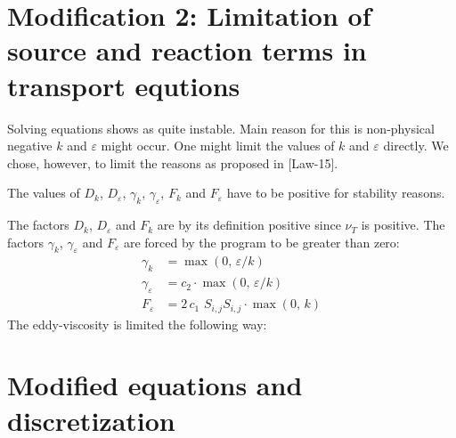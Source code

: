 
\section{Modification 2: Limitation of source and reaction terms in transport equtions} %
\label{sec:modification_2_limitation_of_source_and_reaction_terms_in_transport_equtions}

Solving equations shows as quite instable. Main reason for this is non-physical negative $k$ and $\varepsilon$ might occur. One might limit the values of $k$ and $\varepsilon$ directly. We chose, however, to limit the reasons as proposed in  [Law-15]. 

\vspace{0.2cm}

\noindent The values of $D_k$, $D_\varepsilon$, $\gamma_k$, $\gamma_\varepsilon$, $F_k$ and $F_\varepsilon$ have to be positive for stability reasons.

\vspace{0.2cm}

\noindent The factors $D_k$, $D_\varepsilon$ and $F_k$ are by its definition positive since $\nu_T$ is positive. The factors $\gamma_k$, $\gamma_\varepsilon$ and $F_\varepsilon$ are forced by the program to be greater than zero:
\begin{align}
\gamma_k &= \max{(0,\, \varepsilon/k)}\\
\gamma_\varepsilon &= c_2\cdot\max{(0,\, \varepsilon/k)}\\
F_\varepsilon &= 2\,c_1\,  \,S_{i,j}S_{i,j}\cdot\max{(0,\,k)}
\end{align}
The eddy-viscosity is limited the following way:



\section{Modified equations and discretization} %
\label{sec:modified_equations_and_discretization}



